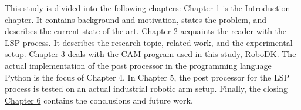 This study is divided into the following chapters: Chapter 1 is the Introduction chapter. It contains background and motivation, states the problem, and describes the current state of the art.
Chapter 2 acquaints the reader with the LSP process.  It describes the research topic, related work, and the experimental setup. 
Chapter 3 deals with the CAM program used in this study, RoboDK. The actual implementation of the post processor in the programming language Python is the focus of Chapter 4. In Chapter 5, the post processor for the LSP process is tested on an actual industrial robotic arm setup. Finally, the closing \hyperref[chap:testing]{Chapter 6} contains the conclusions and future work. 